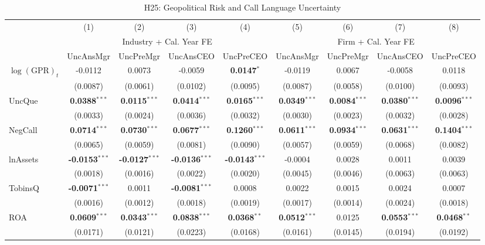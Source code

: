 \documentclass[11pt,a4paper]{article}
\begin{document}
\begin{table}[htbp]
\centering
\caption{H25: Geopolitical Risk and Call Language Uncertainty}
\label{tab:h25_gpr}
\scriptsize
\begin{tabular}{lcccccccc}
\toprule
 & (1) & (2) & (3) & (4) & (5) & (6) & (7) & (8) \\
 & \multicolumn{4}{c}{Industry + Cal. Year FE} & \multicolumn{4}{c}{Firm + Cal. Year FE} \\
\cmidrule(lr){2-5} \cmidrule(lr){6-9}
 & UncAnsMgr & UncPreMgr & UncAnsCEO & UncPreCEO & UncAnsMgr & UncPreMgr & UncAnsCEO & UncPreCEO \\
\midrule
$\log(\text{GPR})_{t}$ & -0.0112 & 0.0073 & -0.0059 & \textbf{0.0147}$^{*}$ & -0.0119 & 0.0067 & -0.0058 & 0.0118 \\
 & (0.0087) & (0.0061) & (0.0102) & (0.0095) & (0.0087) & (0.0058) & (0.0100) & (0.0093) \\
\midrule
UncQue & \textbf{0.0388}$^{***}$ & \textbf{0.0115}$^{***}$ & \textbf{0.0414}$^{***}$ & \textbf{0.0165}$^{***}$ & \textbf{0.0349}$^{***}$ & \textbf{0.0084}$^{***}$ & \textbf{0.0380}$^{***}$ & \textbf{0.0096}$^{***}$ \\
 & (0.0033) & (0.0024) & (0.0036) & (0.0032) & (0.0030) & (0.0023) & (0.0032) & (0.0028) \\
NegCall & \textbf{0.0714}$^{***}$ & \textbf{0.0730}$^{***}$ & \textbf{0.0677}$^{***}$ & \textbf{0.1260}$^{***}$ & \textbf{0.0611}$^{***}$ & \textbf{0.0934}$^{***}$ & \textbf{0.0631}$^{***}$ & \textbf{0.1404}$^{***}$ \\
 & (0.0065) & (0.0059) & (0.0081) & (0.0090) & (0.0057) & (0.0059) & (0.0068) & (0.0082) \\
lnAssets & \textbf{-0.0153}$^{***}$ & \textbf{-0.0127}$^{***}$ & \textbf{-0.0136}$^{***}$ & \textbf{-0.0143}$^{***}$ & -0.0004 & 0.0028 & 0.0011 & 0.0039 \\
 & (0.0018) & (0.0016) & (0.0022) & (0.0020) & (0.0045) & (0.0046) & (0.0063) & (0.0063) \\
TobinsQ & \textbf{-0.0071}$^{***}$ & 0.0011 & \textbf{-0.0081}$^{***}$ & 0.0008 & 0.0022 & 0.0015 & 0.0024 & 0.0007 \\
 & (0.0016) & (0.0012) & (0.0018) & (0.0019) & (0.0017) & (0.0014) & (0.0024) & (0.0018) \\
ROA & \textbf{0.0609}$^{***}$ & \textbf{0.0343}$^{***}$ & \textbf{0.0838}$^{***}$ & \textbf{0.0368}$^{**}$ & \textbf{0.0512}$^{***}$ & 0.0125 & \textbf{0.0553}$^{***}$ & \textbf{0.0468}$^{**}$ \\
 & (0.0171) & (0.0121) & (0.0223) & (0.0168) & (0.0161) & (0.0145) & (0.0194) & (0.0192) \\

\end{tabular}
\end{table}
\end{document}
